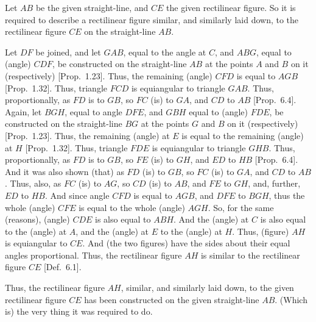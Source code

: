 \begin{Parallel}{}{}
{Let $AB$ be the given straight-line, and $CE$ the given rectilinear figure.
So it is required to describe a rectilinear figure similar, and similarly laid down,   to the rectilinear
figure $CE$ on the straight-line $AB$.

\epsfysize=1.6in
\centerline{}

Let $DF$ be joined, and let $GAB$, equal to the angle at $C$, and $ABG$,
equal to (angle) $CDF$, be constructed  on the straight-line $AB$  
at the points $A$ and $B$ on it (respectively) [Prop.~1.23]. Thus, the
remaining (angle) $CFD$ is equal to $AGB$  [Prop.~1.32].
Thus, triangle $FCD$ is equiangular to triangle $GAB$. Thus, proportionally,
as $FD$ is to $GB$, so $FC$ (is) to $GA$, and $CD$ to $AB$ [Prop.~6.4]. Again, let $BGH$, equal to angle $DFE$,
and $GBH$ equal to (angle) $FDE$, be constructed on the straight-line $BG$  at the points $G$ and
$B$ on it (respectively) [Prop.~1.23]. Thus, the
remaining (angle) at $E$ is equal to the remaining (angle) at $H$  [Prop.~1.32]. Thus, triangle $FDE$ is equiangular to triangle $GHB$.
Thus, proportionally, as $FD$ is to $GB$, so $FE$ (is) to $GH$, and $ED$ to 
$HB$ [Prop.~6.4]. And it was also
shown (that) as $FD$ (is) to $GB$, so $FC$ (is) to $GA$, and $CD$ to $AB$. Thus, also, as $FC$  (is) to $AG$, so  $CD$ (is) to $AB$, and $FE$ to $GH$, and, further, $ED$ to
$HB$. And since angle $CFD$ is equal to $AGB$, and $DFE$ to $BGH$, thus the
whole (angle) $CFE$ is equal to the whole (angle) $AGH$. So, for the same (reasons), (angle) $CDE$ is also equal to $ABH$. And the (angle) at $C$ is also equal to
the (angle) at $A$, and the (angle) at $E$ to the (angle) at $H$. Thus,  (figure) $AH$
is equiangular to $CE$. And (the two figures) have the sides about their equal angles
proportional. Thus, the rectilinear figure $AH$ is similar to the rectilinear figure
$CE$ [Def.~6.1].

Thus, the rectilinear figure $AH$, similar,  and similarly laid down, to the given rectilinear figure
$CE$ has been constructed on the given straight-line
$AB$. (Which is) the very thing it was required to do.}
\end{Parallel}

